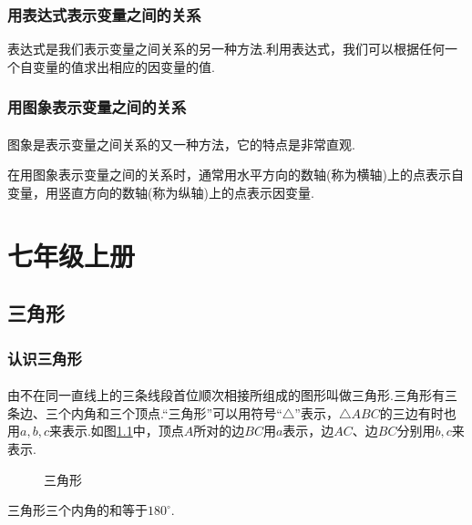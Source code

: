 \documentclass[fontset=windows]{ctexrep}
\begin{document}
\section{用表达式表示变量之间的关系}
\par 表达式是我们表示变量之间关系的另一种方法.利用表达式，我们可以根据任何一个自变量的值求出相应的因变量的值.
\section{用图象表示变量之间的关系}
\subsection{}
\par 图象是表示变量之间关系的又一种方法，它的特点是非常直观.
\par 在用图象表示变量之间的关系时，通常用水平方向的数轴(称为横轴)上的点表示自变量，用竖直方向的数轴(称为纵轴)上的点表示因变量.
\subsection{}
\subsection{}
\part{七年级上册}
\setcounter{chapter}{0}
\chapter{三角形}
\section{认识三角形}
\subsection{}
\par 由不在同一直线上的三条线段首位顺次相接所组成的图形叫做{\heiti 三角形}.三角形有三条边、三个内角和三个顶点.“三角形”可以用符号“$\triangle$”表示，$\triangle ABC$的三边有时也用$a,b,c$来表示.如图\ref{fig:triangle}中，顶点$A$所对的边$BC$用$a$表示，边$AC$、边$BC$分别用$b,c$来表示.
\begin{figure}[htbp]
    \centering
    \caption{三角形}
    \label{fig:triangle}
\end{figure}
\par 三角形三个内角的和等于$180^\circ$.
\end{document}
